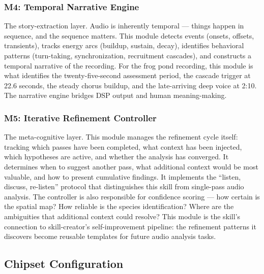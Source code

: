 \documentclass[11pt,letterpaper]{article}
\begin{document}
\subsubsection{M4: Temporal Narrative Engine}

The story-extraction layer. Audio is inherently temporal --- things happen in sequence, and the sequence matters. This module detects events (onsets, offsets, transients), tracks energy arcs (buildup, sustain, decay), identifies behavioral patterns (turn-taking, synchronization, recruitment cascades), and constructs a temporal narrative of the recording. For the frog pond recording, this module is what identifies the twenty-five-second assessment period, the cascade trigger at 22.6 seconds, the steady chorus buildup, and the late-arriving deep voice at 2:10. The narrative engine bridges DSP output and human meaning-making.

\subsubsection{M5: Iterative Refinement Controller}

The meta-cognitive layer. This module manages the refinement cycle itself: tracking which passes have been completed, what context has been injected, which hypotheses are active, and whether the analysis has converged. It determines when to suggest another pass, what additional context would be most valuable, and how to present cumulative findings. It implements the ``listen, discuss, re-listen'' protocol that distinguishes this skill from single-pass audio analysis. The controller is also responsible for confidence scoring --- how certain is the spatial map? How reliable is the species identification? Where are the ambiguities that additional context could resolve? This module is the skill's connection to skill-creator's self-improvement pipeline: the refinement patterns it discovers become reusable templates for future audio analysis tasks.

\subsection{Chipset Configuration}
\end{document}
